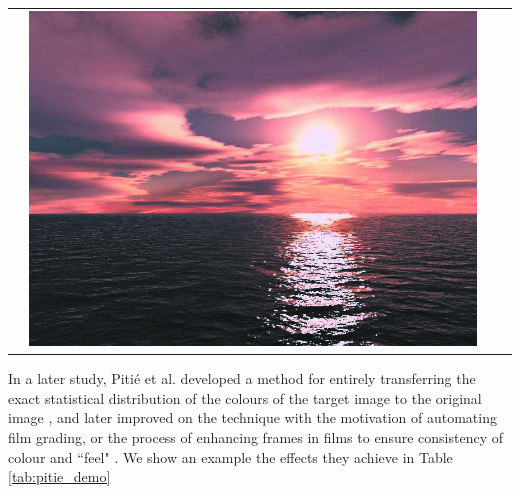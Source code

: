 \begin{longtable}{|N||c|c|c|}
\begin{minipage}{.29\textwidth}
  \end{minipage} & 
  \begin{minipage}{.29\textwidth}
    \includegraphics[width=\textwidth,height=\textheight,keepaspectratio]{images/reinhard_result1}
  \end{minipage} \\
\end{longtable}

In a later study, Piti\'{e} et al. developed a method for entirely transferring the exact statistical distribution of the colours of the target image to the original image \cite{pitie_2005_pdf}, and later improved on the technique with the motivation of automating film grading, or the process of enhancing frames in films to ensure consistency of colour and ``feel" \cite{pitie_2007_grading}. We show an example the effects they achieve in Table \ref{tab:pitie_demo}

